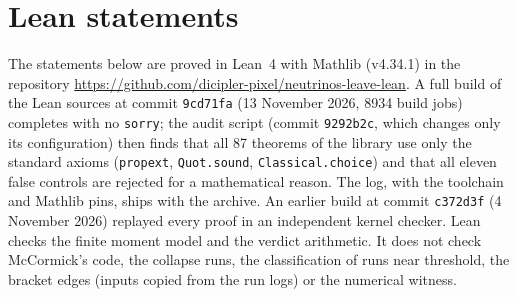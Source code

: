 \documentclass[11pt]{article}
\begin{document}
\section{Lean statements}
\sloppy
The statements below are proved in Lean~4 with Mathlib (v4.34.1) in the repository \url{https://github.com/dicipler-pixel/neutrinos-leave-lean}. A full build of the Lean sources at commit \texttt{9cd71fa} (13 November 2026, 8934 build jobs) completes with no \texttt{sorry}; the audit script (commit \texttt{9292b2c}, which changes only its configuration) then finds that all 87 theorems of the library use only the standard axioms (\texttt{propext}, \texttt{Quot.sound}, \texttt{Classical.choice}) and that all eleven false controls are rejected for a mathematical reason. The log, with the toolchain and Mathlib pins, ships with the archive. An earlier build at commit \texttt{c372d3f} (4 November 2026) replayed every proof in an independent kernel checker. Lean checks the finite moment model and the verdict arithmetic. It does not check McCormick's code, the collapse runs, the classification of runs near threshold, the bracket edges (inputs copied from the run logs) or the numerical witness.
\end{document}
